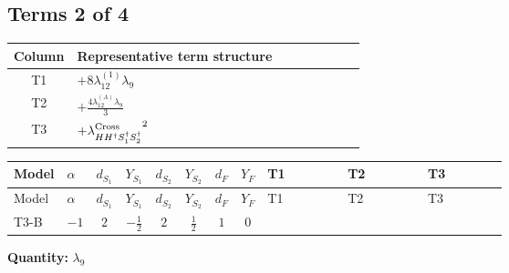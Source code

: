 \documentclass[8pt]{article}
\begin{document}
\begin{landscape}
\subsection*{Terms 2 of 4}
\begin{center}
\begin{tabular}{@{}c >{\raggedright\arraybackslash}p{0.82\linewidth}@{}}
\toprule
Column & Representative term structure \\
\midrule
T1 & \(\displaystyle +8 {\lambda_{12}^{(1)}} {\lambda_9}\) \\
\midrule
T2 & \(\displaystyle +\frac{4 {\lambda_{12}^{(A)}} {\lambda_9}}{3}\) \\
\midrule
T3 & \(\displaystyle +{\lambda_{H H^\dagger S_1^\dagger S_2^\dagger}^{\rm Cross}}^2\) \\
\midrule
\bottomrule
\end{tabular}
\end{center}
\smallskip
\tiny
\begin{longtable}{@{}llcccccc >{\raggedright\arraybackslash}p{0.21\linewidth} >{\raggedright\arraybackslash}p{0.21\linewidth} >{\raggedright\arraybackslash}p{0.21\linewidth}@{}}
\toprule
Model & $\alpha$ & $d_{S_1}$ & $Y_{S_1}$ & $d_{S_2}$ & $Y_{S_2}$ & $d_F$ & $Y_F$ & T1 & T2 & T3 \\
\midrule
\endfirsthead
\toprule
Model & $\alpha$ & $d_{S_1}$ & $Y_{S_1}$ & $d_{S_2}$ & $Y_{S_2}$ & $d_F$ & $Y_F$ & T1 & T2 & T3 \\
\midrule
\endhead
T3-B & $-1$ & $2$ & $-\frac{1}{2}$ & $2$ & $\frac{1}{2}$ & $1$ & $0$ & \scriptsize\adjustbox{max width=\linewidth}{$\begin{gathered} +8 {\lambda_{12}^{(1)}} {\lambda_9}\end{gathered}$} & \scriptsize\adjustbox{max width=\linewidth}{$\begin{gathered} +\frac{4 {\lambda_{12}^{(A)}} {\lambda_9}}{3}\end{gathered}$} & \scriptsize\adjustbox{max width=\linewidth}{$\begin{gathered} +{\lambda_{H H^\dagger S_1^\dagger S_2^\dagger}^{\rm Cross}}^2\end{gathered}$} \\
\midrule
\bottomrule
\end{longtable}
\clearpage
\noindent\textbf{Quantity: }$\lambda_{9}$\par\smallskip

\end{landscape}
\end{document}
